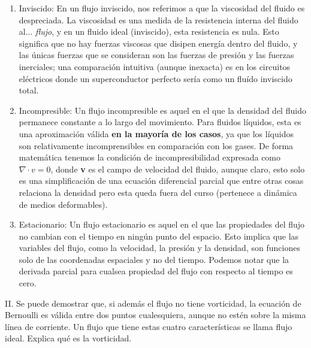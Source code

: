 \documentclass{article}
\begin{document}
\begin{enumerate}
    \item Inviscido: En un flujo inviscido, nos referimos a que la viscosidad del fluido es despreciada. La viscosidad es una medida de la resistencia interna del fluido al... \textit{flujo}, y en un fluido ideal (inviscido), esta resistencia es nula. Esto significa que no hay fuerzas viscosas que disipen energía dentro del fluido, y las únicas fuerzas que se consideran son las fuerzas de presión y las fuerzas inerciales; una comparación intuitiva (aunque inexacta) es en los circuitos eléctricos donde un superconductor perfecto sería como un fluído inviscido total.
    \item Incompresible: Un flujo incompresible es aquel en el que la densidad del fluido permanece constante a lo largo del movimiento. Para fluidos líquidos, esta es una aproximación válida \textbf{en la mayoría de los casos}, ya que los líquidos son relativamente incomprensibles en comparación con los gases. De forma matemática tenemos la condición de incompresibilidad expresada como $\nabla \cdot v = 0$, donde \textbf{v} es el campo de velocidad del fluido, aunque claro, esto solo es una simplificación de una ecuación diferencial parcial que entre otras cosas relaciona la densidad pero esta queda fuera del curso (pertenece a dinámica de medios deformables).
    \item Estacionario: Un flujo estacionario es aquel en el que las propiedades del flujo no cambian con el tiempo en ningún punto del espacio. Esto implica que las variables del flujo, como la velocidad, la presión y la densidad, son funciones solo de las coordenadas espaciales y no del tiempo. Podemos notar que la derivada parcial para cualsea propiedad del flujo con respecto al tiempo es cero.
\end{enumerate}

\noindent II. Se puede demostrar que, si además el flujo no tiene vorticidad, la ecuación de Bernoulli es válida entre dos puntos cualesquiera, aunque no estén sobre la misma línea de corriente. Un flujo que tiene estas cuatro características se llama flujo ideal. Explica qué es la vorticidad. \\
\end{document}

